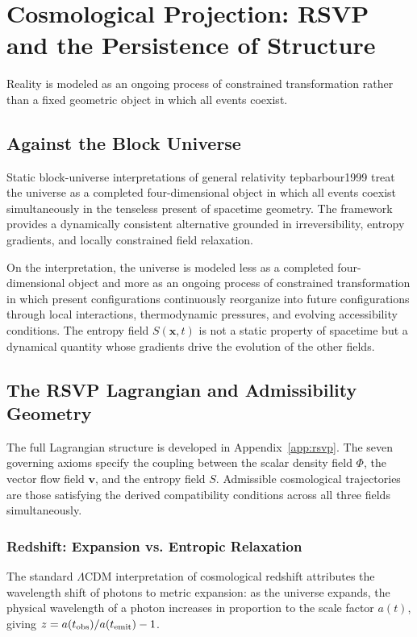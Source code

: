 \chapter{Cosmological Projection: RSVP and the Persistence of Structure}
\label{ch:cosmological}

\epigraph{Reality is modeled as an ongoing process of constrained transformation
rather than a fixed geometric object in which all events coexist.}{}

\section{Against the Block Universe}

Static block-universe interpretations of general relativity 	tep{barbour1999} treat the universe as
a completed four-dimensional object in which all events coexist simultaneously in
the tenseless present of spacetime geometry. The \RSVP framework provides a dynamically
consistent alternative grounded in irreversibility, entropy gradients, and locally
constrained field relaxation.

On the \RSVP interpretation, the universe is modeled less as a completed
four-dimensional object and more as an ongoing process of constrained transformation
in which present configurations continuously reorganize into future configurations
through local interactions, thermodynamic pressures, and evolving accessibility
conditions. The entropy field $S(\mathbf{x}, t)$ is not a static property of
spacetime but a dynamical quantity whose gradients drive the evolution of the
other fields.

\section{The RSVP Lagrangian and Admissibility Geometry}

The full Lagrangian structure is developed in Appendix~\ref{app:rsvp}. The seven
governing axioms specify the coupling between the scalar density field $\Phi$, the
vector flow field $\mathbf{v}$, and the entropy field $S$. Admissible cosmological
trajectories are those satisfying the derived compatibility conditions across all
three fields simultaneously.

\subsection*{Redshift: Expansion vs. Entropic Relaxation}

The standard $\Lambda$CDM interpretation of cosmological redshift attributes the
wavelength shift of photons to metric expansion: as the universe expands, the
physical wavelength of a photon increases in proportion to the scale factor $a(t)$,
giving $z = a(t_{\rm obs})/a(t_{\rm emit}) - 1$.

